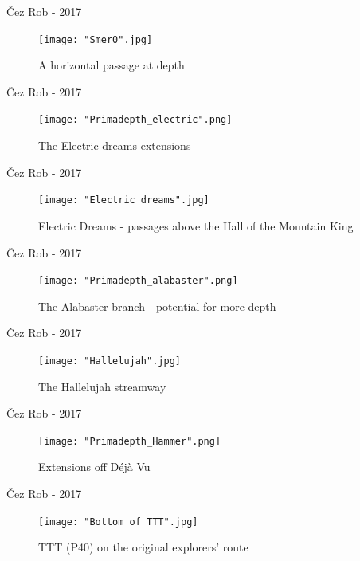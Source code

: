 \documentclass[10pt]{beamer}
\begin{document}
\begin{frame}{Čez Rob - 2017}
    \begin{figure}[!ht]
    \centering
    \texttt{[image: "Smer0".jpg]}
    \caption{A horizontal passage at depth}
    \end{figure}
\end{frame} 

\begin{frame}{Čez Rob - 2017}
    \begin{figure}[!ht]
    \centering
    \texttt{[image: "Primadepth\_electric".png]}
    \caption{The Electric dreams extensions}
    \end{figure}
\end{frame} 

\begin{frame}{Čez Rob - 2017}
    \begin{figure}[!ht]
    \centering
    \texttt{[image: "Electric dreams".jpg]}
    \caption{Electric Dreams - passages above the Hall of the Mountain King}
    \end{figure}
\end{frame} 

\begin{frame}{Čez Rob - 2017}
    \begin{figure}[!ht]
    \centering
    \texttt{[image: "Primadepth\_alabaster".png]}
    \caption{The Alabaster branch - potential for more depth}
    \end{figure}
\end{frame} 

\begin{frame}{Čez Rob - 2017}
    \begin{figure}[!ht]
    \centering
    \texttt{[image: "Hallelujah".jpg]}
    \caption{The Hallelujah streamway}
    \end{figure}
\end{frame} 

\begin{frame}{Čez Rob - 2017}
    \begin{figure}[!ht]
    \centering
    \texttt{[image: "Primadepth\_Hammer".png]}
    \caption{Extensions off Déjà Vu}
    \end{figure}
\end{frame} 


\begin{frame}{Čez Rob - 2017}
    \begin{figure}[!ht]
    \centering
    \texttt{[image: "Bottom of TTT".jpg]}
    \caption{TTT (P40) on the original explorers' route}
    \end{figure}
\end{frame} 
\end{document}
